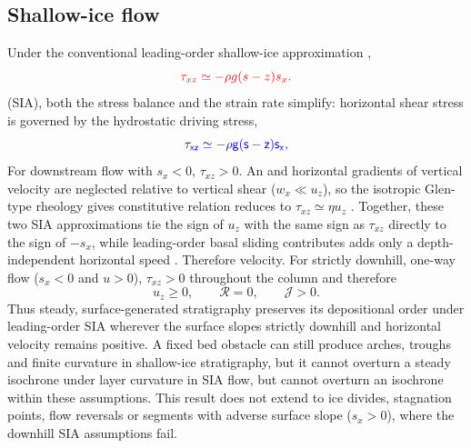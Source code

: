 \documentclass[review]{igs}
\providecommand{\DIFadd}[1]{{\protect\color{blue} \sf #1}} %
\providecommand{\DIFdel}[1]{{\protect\color{red} \scriptsize #1}} %
\providecommand{\DIFaddbegin}{} %
\providecommand{\DIFaddend}{} %
\providecommand{\DIFdelbegin}{} %
\providecommand{\DIFdelend}{} %
\newcommand{\DIFscaledelfig}{0.5}
\newlength{\DIFdelgraphicswidth} %
\newlength{\DIFdelgraphicsheight} %
\newcommand{\DIFaddincludegraphics}[2][]{{\color{blue}\fbox{\DIFOincludegraphics[#1]{#2}}}} %
\newcommand{\DIFdelincludegraphics}[2][]{%
\sbox{\DIFdelgraphicsbox}{\DIFOincludegraphics[#1]{#2}}%
\settoboxwidth{\DIFdelgraphicswidth}{\DIFdelgraphicsbox} %
\settoboxtotalheight{\DIFdelgraphicsheight}{\DIFdelgraphicsbox} %
\scalebox{\DIFscaledelfig}{%
\parbox[b]{\DIFdelgraphicswidth}{\usebox{\DIFdelgraphicsbox}\\[-\baselineskip] \rule{\DIFdelgraphicswidth}{0em}}\llap{\resizebox{\DIFdelgraphicswidth}{\DIFdelgraphicsheight}{%
\setlength{\unitlength}{\DIFdelgraphicswidth}%
\begin{picture}(1,1)%
\thicklines\linethickness{2pt} %
{\color[rgb]{1,0,0}\put(0,0){\framebox(1,1){}}}%
{\color[rgb]{1,0,0}\put(0,0){\line( 1,1){1}}}%
{\color[rgb]{1,0,0}\put(0,1){\line(1,-1){1}}}%
\end{picture}%
}\hspace*{3pt}}} %
} %
\DeclareRobustCommand{\DIFaddbegin}{\DIFOaddbegin \let\includegraphics\DIFaddincludegraphics} %
\DeclareRobustCommand{\DIFaddend}{\DIFOaddend \let\includegraphics\DIFOincludegraphics} %
\DeclareRobustCommand{\DIFdelbegin}{\DIFOdelbegin \let\includegraphics\DIFdelincludegraphics} %
\DeclareRobustCommand{\DIFdelend}{\DIFOaddend \let\includegraphics\DIFOincludegraphics} %
\begin{document}
\subsection{Shallow-ice flow}

Under the conventional \DIFaddbegin \DIFadd{leading-order }\DIFaddend shallow-ice approximation \DIFdelbegin \DIFdel{,
}\begin{displaymath}
\DIFdel{\tau_{xz}\simeq-\rho g(s-z)s_x.
}\end{displaymath}%
\DIFdelend \DIFaddbegin \DIFadd{(SIA), both the stress balance and the strain rate simplify: horizontal shear stress is governed by the hydrostatic driving stress,
}\begin{equation}
\DIFadd{\tau_{xz}\simeq-\rho g(s-z)s_x,
\label{eq:SIAstress}
}\end{equation}\DIFaddend 
\DIFdelbegin \DIFdel{For downstream flow with \(s_x<0\), \(\tau_{xz}>0\). An }\DIFdelend \DIFaddbegin \DIFadd{and horizontal gradients of vertical velocity are neglected relative to vertical shear (\(w_x\ll u_z\)), so the }\DIFaddend isotropic Glen-type \DIFdelbegin \DIFdel{rheology gives }\DIFdelend \DIFaddbegin \DIFadd{constitutive relation reduces to \(\tau_{xz}\simeq\eta u_z\) \citep{CuffeyPaterson2010}. Together, these two SIA approximations tie the sign of }\DIFaddend \(u_z\) \DIFdelbegin \DIFdel{with the same sign as \(\tau_{xz}\)}\DIFdelend \DIFaddbegin \DIFadd{directly to the sign of \(-s_x\)}\DIFaddend , while leading-order basal sliding \DIFdelbegin \DIFdel{contributes }\DIFdelend \DIFaddbegin \DIFadd{adds only }\DIFaddend a depth-independent horizontal \DIFdelbegin \DIFdel{speed \citep{CuffeyPaterson2010}. Therefore
}\DIFdelend \DIFaddbegin \DIFadd{velocity. For strictly downhill, one-way flow (\(s_x<0\) and \(u>0\)), \(\tau_{xz}>0\) throughout the column and therefore
}\DIFaddend \begin{equation}
 u_z\geq0,
 \qquad \mathcal{R}=0,
 \qquad \mathcal{J}>0.
\label{eq:SIAorder}
\end{equation}
\DIFaddbegin \DIFadd{Thus steady, surface-generated stratigraphy preserves its depositional order under leading-order SIA wherever the surface slopes strictly downhill and horizontal velocity remains positive. }\DIFaddend A fixed bed obstacle can \DIFaddbegin \DIFadd{still }\DIFaddend produce arches, troughs and finite \DIFdelbegin \DIFdel{curvature in shallow-ice stratigraphy, but it cannot overturn a steady isochrone under }\DIFdelend \DIFaddbegin \DIFadd{layer curvature in SIA flow, but cannot overturn an isochrone within }\DIFaddend these assumptions. \DIFaddbegin \DIFadd{This result does not extend to ice divides, stagnation points, flow reversals or segments with adverse surface slope (\(s_x>0\)), where the downhill SIA assumptions fail.
}\DIFaddend 
\end{document}
